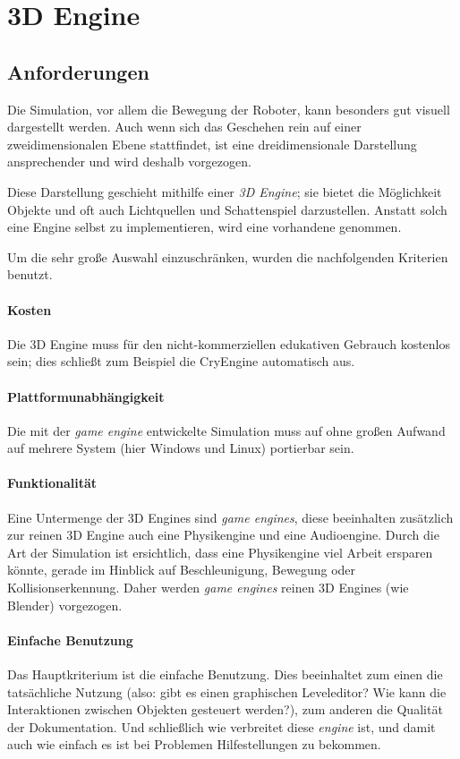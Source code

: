 \clearpage
\section{3D Engine}
\subsection{Anforderungen}
Die Simulation, vor allem die Bewegung der Roboter, kann besonders gut visuell dargestellt werden. Auch wenn sich das Geschehen rein auf einer zweidimensionalen Ebene stattfindet, ist eine dreidimensionale
Darstellung ansprechender und wird deshalb vorgezogen.

Diese Darstellung geschieht mithilfe einer \textit{3D Engine}; sie bietet die M{\"{o}}glichkeit Objekte und oft auch Lichtquellen und Schattenspiel darzustellen.
Anstatt solch eine Engine selbst zu implementieren, wird eine vorhandene genommen.

Um die sehr gro{\ss}e Auswahl einzuschr{\"{a}}nken, wurden die nachfolgenden Kriterien benutzt.

\paragraph{Kosten} Die 3D Engine muss f{\"{u}}r den nicht-kommerziellen edukativen Gebrauch kostenlos sein;
dies schlie{\ss}t zum Beispiel die CryEngine\cite{cryengine} automatisch aus.

\paragraph{Plattformunabh{\"{a}}ngigkeit} Die mit der \textit{game engine} entwickelte Simulation muss auf
ohne gro{\ss}en Aufwand auf mehrere System (hier Windows und Linux) portierbar sein.

\paragraph{Funktionalit{\"{a}}t} Eine Untermenge der 3D Engines sind \textit{game engines}, diese beeinhalten 
zus{\"{a}}tzlich zur reinen 3D Engine auch eine Physikengine und eine Audioengine.
Durch die Art der Simulation ist ersichtlich, dass eine Physikengine viel Arbeit ersparen k{\"{o}}nnte, gerade im Hinblick auf Beschleunigung, Bewegung oder Kollisionserkennung. Daher werden \textit{game engines} reinen 3D Engines (wie Blender) vorgezogen.

\paragraph{Einfache Benutzung} Das Hauptkriterium ist die einfache Benutzung. Dies beeinhaltet zum einen die
tats{\"{a}}chliche Nutzung (also: gibt es einen graphischen Leveleditor? Wie kann die Interaktionen zwischen
Objekten gesteuert werden?), zum anderen die Qualit{\"{a}}t der Dokumentation. Und schließlich wie verbreitet diese
\textit{engine} ist, und damit auch wie einfach es ist bei Problemen Hilfestellungen zu bekommen.

